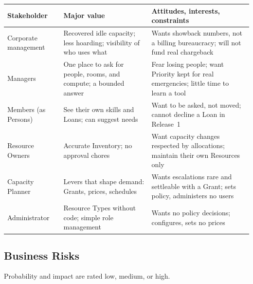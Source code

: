 {\footnotesize
\begin{tabularx}{\textwidth}{@{}L{2.6cm}YY@{}}
\toprule
\textbf{Stakeholder} & \textbf{Major value} & \textbf{Attitudes, interests, constraints} \\
\midrule
Corporate management & Recovered idle capacity; less hoarding; visibility of who uses what & Wants showback numbers, not a billing bureaucracy; will not fund real chargeback \\
Managers & One place to ask for people, rooms, and compute; a bounded answer & Fear losing people; want Priority kept for real emergencies; little time to learn a tool \\
Members (as Persons) & See their own skills and Loans; can suggest needs & Want to be asked, not moved; cannot decline a Loan in Release~1 \\
Resource Owners & Accurate Inventory; no approval chores & Want capacity changes respected by allocations; maintain their own Resources only \\
Capacity Planner & Levers that shape demand: Grants, prices, schedules & Wants escalations rare and settleable with a Grant; sets policy, administers no users \\
Administrator & Resource Types without code; simple role management & Wants no policy decisions; configures, sets no prices \\
\bottomrule
\end{tabularx}
}

\subsection{Business Risks}

Probability and impact are rated low, medium, or high.


